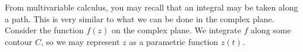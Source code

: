 

From multivariable calculus, you may recall that an integral may be taken along a path. This is very similar to what we can be done in the complex plane. Consider the function $f(z)$ on the complex plane. We integrate $f$ along some contour $C$, so we may represent $z$ as a parametric function $z(t)$. 